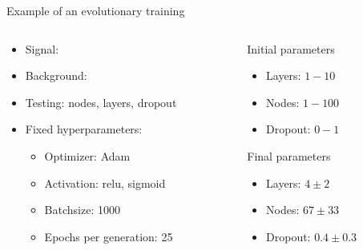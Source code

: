 \begin{frame}{Example of an evolutionary training}
    \begin{columns}
        \begin{column}{0.5\textwidth}
            \vspace{-0.4cm}
            \begin{itemize}
                \item Signal: \tHq
                \vspace{0.3cm}
                \item Background: \ttbar
                \vspace{0.3cm}
                \item Testing: nodes, layers, dropout
                \vspace{0.3cm}
                \item Fixed hyperparameters:
                    \begin{itemize}
                        \item Optimizer: Adam
                        \item Activation: relu, sigmoid
                        \item Batchsize: 1000
                        \item Epochs per generation: 25
                    \end{itemize}
            \end{itemize}
        \end{column}
            \begin{column}{0.5\textwidth}
                \begin{block}{Initial parameters}
                    \begin{itemize}
                        \item Layers: $1-10$
                        \item Nodes: $1-100$
                        \item Dropout: $0-1$
                    \end{itemize}
                \end{block}
                \begin{block}{Final parameters}
                    \begin{itemize}
                        \item Layers: $4\pm2$
                        \item Nodes: $67\pm33$
                        \item Dropout: $0.4\pm0.3$
                    \end{itemize}
                \end{block}
        \end{column}
    \end{columns}
\end{frame}


